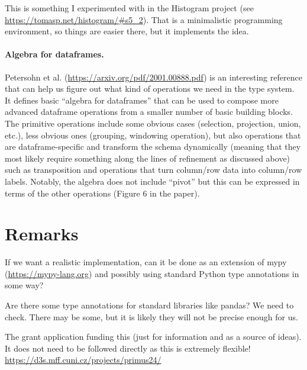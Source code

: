 \documentclass{article}
\begin{document}
This is something I experimented with in the
Histogram project (see \url{https://tomasp.net/histogram/#s5_2}). That is a minimalistic programming environment, so things are easier there, but it implements the idea.

\paragraph{Algebra for dataframes.}
Petersohn et al. (\url{https://arxiv.org/pdf/2001.00888.pdf}) is an interesting reference that
can help us figure out what kind of operations we need in the type system. It defines basic
``algebra for dataframes'' that can be used to compose more advanced dataframe operations from
a smaller number of basic building blocks. The primitive operations include some obvious
cases (selection, projection, union, etc.), less obvious ones (grouping, windowing operation),
but also operations that are dataframe-specific and transform the schema dynamically (meaning
that they most likely require something along the lines of refinement as discussed above) such
as transposition and operations that turn column/row data into column/row labels. Notably,
the algebra does not include ``pivot'' but this can be expressed in terms of the other operations
(Figure 6 in the paper).

\section{Remarks}
If we want a realistic implementation, can it be done as an extension of mypy (\url{https://mypy-lang.org}) and possibly using standard Python type annotations in some way?

Are there some type annotations for standard libraries like pandas? We need to check. There may be some, but it is likely they will not be precise enough for us.

The grant application funding this (just for information and as a source of ideas). It does not need to be followed directly as this is extremely flexible! \url{https://d3s.mff.cuni.cz/projects/primus24/}
\end{document}
